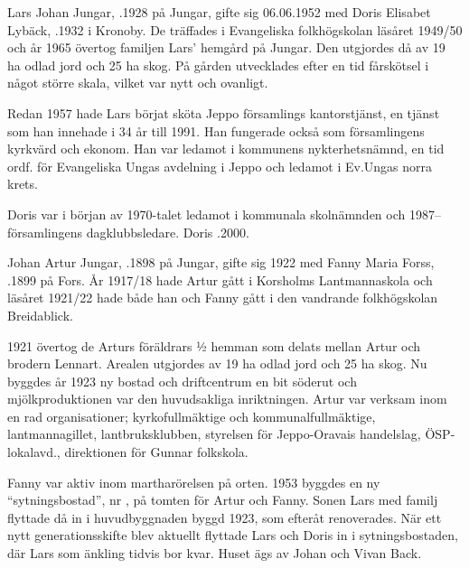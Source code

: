 Lars Johan Jungar, .1928 på Jungar, gifte sig 06.06.1952 med Doris Elisabet Lybäck, .1932 i Kronoby. De träffades i Evangeliska folkhögskolan läsåret 1949/50 och år 1965 övertog familjen Lars' hemgård på Jungar. Den utgjordes då av 19 ha odlad jord och 25 ha skog. På gården utvecklades efter en tid fårskötsel i något större skala, vilket var nytt och ovanligt.

Redan 1957 hade Lars börjat sköta Jeppo församlings kantorstjänst, en tjänst som han innehade i 34 år till 1991. Han fungerade också som församlingens kyrkvärd och ekonom. Han var ledamot i kommunens nykterhetsnämnd, en tid ordf. för Evangeliska Ungas avdelning i Jeppo och ledamot i Ev.Ungas norra krets.

Doris var i början av 1970-talet ledamot i kommunala skolnämnden och 1987-- församlingens dagklubbsledare. Doris .2000.
\begin{jhchildren}
  \item {}
  \item {}
  \item {}
\end{jhchildren}



Johan Artur Jungar, .1898 på Jungar, gifte sig 1922  med Fanny Maria Forss, .1899 på Fors. År 1917/18 hade Artur gått i Korsholms Lantmannaskola och läsåret 1921/22 hade både han och Fanny gått i den vandrande folkhögskolan Breidablick.

1921 övertog de Arturs föräldrars ½  hemman som delats mellan Artur och brodern Lennart. Arealen utgjordes av 19 ha odlad jord och 25 ha skog. Nu byggdes år 1923 ny bostad och driftcentrum en bit söderut och mjölkproduktionen var den huvudsakliga inriktningen. Artur var verksam inom en rad organisationer; kyrkofullmäktige och kommunalfullmäktige, lantmannagillet, lantbruksklubben, styrelsen för Jeppo-Oravais handelslag, ÖSP-lokalavd., direktionen för Gunnar folkskola.

Fanny var aktiv inom martharörelsen på orten. 1953 byggdes en ny ``sytningsbostad'', nr , på tomten för Artur och Fanny. Sonen Lars med familj flyttade då in i huvudbyggnaden byggd 1923, som efteråt renoverades. När ett nytt generationsskifte blev aktuellt flyttade Lars och Doris in i sytningsbostaden, där Lars som änkling tidvis bor kvar. Huset ägs av Johan och Vivan Back.

